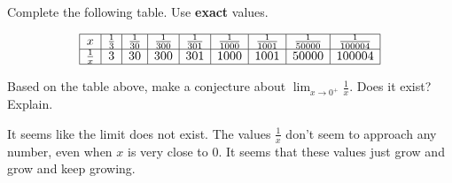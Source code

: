 \documentclass{ximera}
\author{Nela Lakos \and Kyle Parsons}
\begin{document}
\begin{exercise}

Complete the following table.  Use \textbf{exact} values.

\[
\begin{array}{|c|c|c|c|c|c|c|c|c|}
\hline
x & \frac{1}{3} & \frac{1}{30} & \frac{1}{300} & \frac{1}{301} & \frac{1}{1000} & \frac{1}{1001} & \frac{1}{50000} & \frac{1}{100004}\\\hline
\frac{1}{x} & 3 & 30 & 300 & 301 & 1000 & 1001 & 50000 & 100004 \\\hline
\end{array}
\]

\begin{exercise}
Based on the table above, make a conjecture about $\lim_{x\to 0^{+}}\frac{1}{x}$.  Does it exist? Explain.
\begin{freeResponse}
It seems like the limit does not exist.  The values $\frac{1}{x}$ don't seem to approach any number, even when $x$ is very close to 0.  It seems that these values just grow and grow and keep growing.
\end{freeResponse}
\end{exercise}

\end{exercise}
\end{document}
